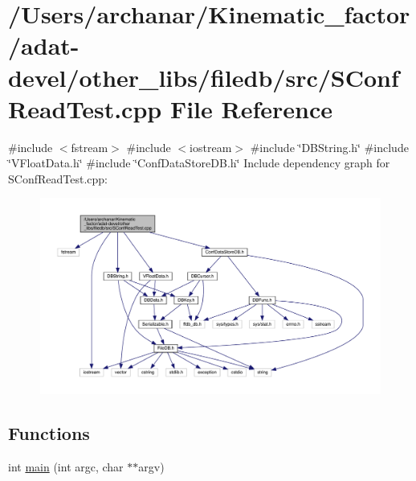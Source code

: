 \hypertarget{adat-devel_2other__libs_2filedb_2src_2SConfReadTest_8cpp}{}\section{/\+Users/archanar/\+Kinematic\+\_\+factor/adat-\/devel/other\+\_\+libs/filedb/src/\+S\+Conf\+Read\+Test.cpp File Reference}
\label{adat-devel_2other__libs_2filedb_2src_2SConfReadTest_8cpp}
{\ttfamily \#include $<$fstream$>$}\newline
{\ttfamily \#include $<$iostream$>$}\newline
{\ttfamily \#include \char`\"{}D\+B\+String.\+h\char`\"{}}\newline
{\ttfamily \#include \char`\"{}V\+Float\+Data.\+h\char`\"{}}\newline
{\ttfamily \#include \char`\"{}Conf\+Data\+Store\+D\+B.\+h\char`\"{}}\newline
Include dependency graph for S\+Conf\+Read\+Test.\+cpp\+:
\nopagebreak
\begin{figure}[H]
\begin{center}
\leavevmode
\includegraphics[width=350pt]{da/d1a/adat-devel_2other__libs_2filedb_2src_2SConfReadTest_8cpp__incl}
\end{center}
\end{figure}
\subsection*{Functions}
\begin{DoxyCompactItemize}
\item 
int \mbox{\hyperlink{adat-devel_2other__libs_2filedb_2src_2SConfReadTest_8cpp_a3c04138a5bfe5d72780bb7e82a18e627}{main}} (int argc, char $\ast$$\ast$argv)
\end{DoxyCompactItemize}


